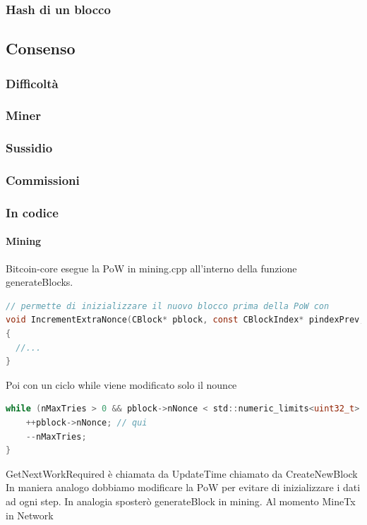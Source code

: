 \documentclass{book}
\theoremstyle{definition}
\begin{document}
\subsubsection{Hash di un blocco}

\newpage
\subsection{Consenso}
\subsubsection{Difficoltà}
\subsubsection{Miner}
\subsubsection{Sussidio}
\subsubsection{Commissioni}
\subsubsection{In codice}

\paragraph{Mining}
Bitcoin-core esegue la PoW in mining.cpp all'interno della funzione generateBlocks.

\lstset{style=mystyle}
\begin{lstlisting}[language=c]
// permette di inizializzare il nuovo blocco prima della PoW con
void IncrementExtraNonce(CBlock* pblock, const CBlockIndex* pindexPrev, unsigned int& nExtraNonce)
{
  //...
}
\end{lstlisting}

Poi con un ciclo while viene modificato solo il nounce

\lstset{style=mystyle}
\begin{lstlisting}[language=c]
while (nMaxTries > 0 && pblock->nNonce < std::numeric_limits<uint32_t>::max() && !CheckProofOfWork(pblock->GetHash(), pblock->nBits, Params().GetConsensus()) && !ShutdownRequested()) {
    ++pblock->nNonce; // qui
    --nMaxTries;
}
\end{lstlisting}

GetNextWorkRequired è chiamata da UpdateTime chiamato da CreateNewBlock
In maniera analogo dobbiamo modificare la PoW per evitare di inizializzare i dati ad ogni step.
In analogia sposterò generateBlock in mining. Al momento MineTx in Network
\end{document}
